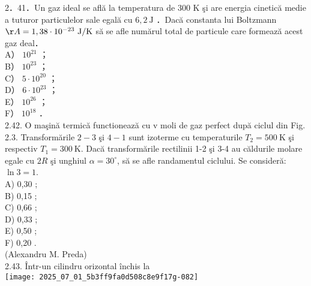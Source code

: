 2．41．Un gaz ideal se află la temperatura de 300 K şi are energia cinetică medie a tuturor particulelor sale egală cu $6,2 \mathrm{~J}$ ．Dacă constanta lui Boltzmann $\AA=1,38 \cdot 10^{-23} \mathrm{~J} / \mathrm{K}$ să se afle numărul total de particule care formează acest gaz deal．\\
A） $10^{21}$ ；\\
B） $10^{23}$ ；\\
C） $5 \cdot 10^{20}$ ；\\
D） $6 \cdot 10^{23}$ ；\\
E） $10^{26}$ ；\\
F） $10^{18}$ ．\\
2.42. O maşină termică functionează cu v moli de gaz perfect după ciclul din Fig. 2.3. Transformările $2-3$ şi $4-1$ sunt izoterme cu temperaturile $T_{2}=500 \mathrm{~K}$ şi respectiv $T_{1}=300 \mathrm{~K}$. Dacă transformările rectilinii 1-2 şi 3-4 au căldurile molare egale cu $2 R$ şi unghiul $\alpha=30^{\circ}$, să se afle randamentul ciclului. Se consideră: $\ln 3=1$.\\
A) 0,30 ;\\
B) 0,15 ;\\
C) 0,66 ;\\
D) 0,33 ;\\
E) 0,50 ;\\
F) 0,20 .\\
(Alexandru M. Preda)\\
2.43. Într-un cilindru orizontal închis la\\
\texttt{[image: 2025\_07\_01\_5b3ff9fa0d508c8e9f17g-082]}

